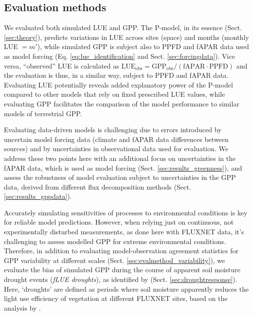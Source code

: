 \documentclass[gmd, manuscript]{copernicus}
\begin{document}
\subsection{Evaluation methods}
\label{sec:methods_eval}

We evaluated both simulated LUE and GPP. The P-model, in its essence (Sect. \ref{sec:theory}), predicts variations in LUE across sites (space) and months (monthly LUE $= m'$), while simulated GPP is subject also to PPFD and fAPAR data used as model forcing (Eq. \ref{eq:lue_identification} and Sect. \ref{sec:forcingdata}). Vice versa, ``observed'' LUE is calculated as $\text{LUE}_\text{obs} = \text{GPP}_\text{obs} / (\text{fAPAR} \cdot \text{PPFD})$ and the evaluation is thus, in a similar way, subject to PPFD and fAPAR data. Evaluating LUE potentially reveals added explanatory power of the P-model compared to other models that rely on fixed prescribed LUE values, while evaluating GPP facilitates the comparison of the model performance to similar models of terrestrial GPP.

Evaluating data-driven models is challenging due to errors introduced by uncertain model forcing data \citep{ryu19rse} (climate and fAPAR data differences between sources) and by uncertainties in observational data used for evaluation. We address these two points here with an additional focus on uncertainties in the fAPAR data, which is used as model forcing (Sect. \ref{sec:results_greenness}), and assess the robustness of model evaluation subject to uncertainties in the GPP data, derived from different flux decomposition methods (Sect. \ref{sec:results_gppdata}). 

Accurately simulating sensitivities of processes to environmental conditions is key for reliable model predictions. However, when relying just on continuous, not experimentally disturbed measurements, as done here with FLUXNET data, it's challenging to assess modelled GPP for extreme environmental conditions. Therefore, in addition to evaluating model-observation agreement statistics for GPP variability at different scales (Sect. \ref{sec:evalmethod_variability}), we evaluate the bias of simulated GPP during the course of apparent soil moisture drought events (\textit{fLUE droughts}), as identified by \citet{stocker18newphyt} (Sect. \ref{sec:droughtresponse}). Here, `droughts' are defined as periods where soil moisture apparently reduces the light use efficiency of vegetation at different FLUXNET sites, based on the analysis by \citet{stocker18newphyt}.
\end{document}

